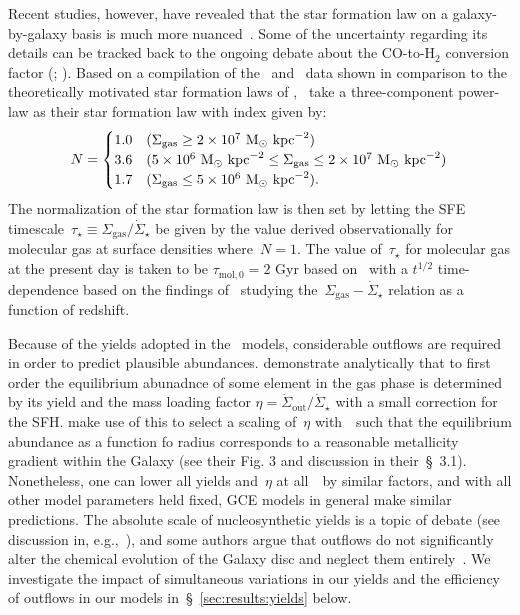 \documentclass[ms.tex]{subfiles}
\begin{document}
Recent studies, however, have revealed that the star formation law on a
galaxy-by-galaxy basis is much more nuanced~\citep{delosReyes2019, Ellison2021,
Kennicutt2021}.
Some of the uncertainty regarding its details can be tracked back to the
ongoing debate about the CO-to-H$_2$ conversion factor (\citealp{Kennicutt2012};
\citealp*{Liu2015}).
Based on a compilation of the~\citet{Bigiel2010} and~\citet{Leroy2013} data
shown in comparison to the theoretically motivated star formation laws of
\citet[][see their Fig. 2]{Krumholz2018},~\citet{Johnson2021} take a
three-component power-law as their star formation law with index given by:
\begin{equation}
N =
\begin{cases}
1.0 & (\Sigma_\text{gas} \geq 2\times10^7~\text{M}_\odot~\text{kpc}^{-2}) \\
3.6 & (5\times10^6~\text{M}_\odot~\text{kpc}^{-2} \leq \Sigma_\text{gas} \leq
2\times10^7~\text{M}_\odot~\text{kpc}^{-2}) \\
1.7 & (\Sigma_\text{gas} \leq 5\times10^6~\text{M}_\odot~\text{kpc}^{-2}).
\end{cases}
\label{eq:sflaw_indeces}
\end{equation}
The normalization of the star formation law is then set by letting the SFE
timescale~$\tau_\star \equiv \Sigma_\text{gas} / \dot{\Sigma}_\star$ be given
by the value derived observationally for molecular gas at surface densities
where~$N = 1$.
The value of~$\tau_\star$ for molecular gas at the present day is taken to be
$\tau_{\text{mol},0} = 2$ Gyr based on~\citet{Leroy2008, Leroy2013} with a
$t^{1/2}$ time-dependence based on the findings of~\citet{Tacconi2018} studying
the~$\Sigma_\text{gas} - \dot{\Sigma}_\star$ relation as a function of
redshift.
\par
Because of the yields adopted in the~\citet{Johnson2021} models, considerable
outflows are required in order to predict plausible abundances.
\citet{Weinberg2017} demonstrate analytically that to first order the
equilibrium abunadnce of some element in the gas phase is determined by its
yield and the mass loading factor
$\eta = \dot{\Sigma}_\text{out} / \dot{\Sigma}_\star$ with a small correction
for the SFH.
\citet{Johnson2021} make use of this to select a scaling of~$\eta$
with~\rgal~such that the equilibrium abundance as a function fo radius
corresponds to a reasonable metallicity gradient within the Galaxy (see their
Fig. 3 and discussion in their~\S~3.1).
Nonetheless, one can lower all yields and~$\eta$ at all~\rgal~by similar
factors, and with all other model parameters held fixed, GCE models in general
make similar predictions.
The absolute scale of nucleosynthetic yields is a topic of debate (see
discussion in, e.g.,~\citealp{Griffith2021a}), and some authors argue that
outflows do not significantly alter the chemical evolution of the Galaxy disc
and neglect them entirely~\citep[e.g.][]{Spitoni2019, Spitoni2021}.
We investigate the impact of simultaneous variations in our yields and the
efficiency of outflows in our models in~\S~\ref{sec:results:yields} below.
\end{document}
